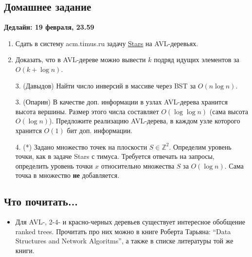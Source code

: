 \subsection{Домашнее задание}
\textbf{Дедлайн: 19 февраля, 23.59}

\begin{enumerate}

  \item Сдать в систему acm.timus.ru задачу
\href{http://acm.timus.ru/problem.aspx?space=1&num=1028}{Stars}
на AVL-деревьях.

  \item Доказать, что в AVL-дереве можно вывести $k$ подряд идущих элементов за
$O(k + \log n)$.

  \item[3.] (Давыдов) Найти число инверсий в массиве через BST за $O(n \log n)$.

  \item[3.] (Опарин) В качестве доп. информации в узлах AVL-дерева хранится
высота вершины. Размер этого числа составляет $O(\log \log n)$ (сама высота
$O(\log n)$). Предложите реализацию AVL-дерева, в каждом узле которого
хранится $O(1)$ бит доп. информации.

  \item[4.] (*) Задано множество точек на плоскости $S \in \mathbb{Z}^2$.
Определим уровень точки, как в задаче Stars с тимуса.  Требуется отвечать на
запросы, определить уровень точки $x$ относительно множества $S$ за $O(\log n)$.
Сама точка в множество \textbf{не} добавляется.

\end{enumerate}

\subsection{Что почитать...}

\begin{itemize}
  
  \item Для AVL-, 2-4- и красно-черных деревьев существует интересное обобщение
ranked trees. Прочитать про них можно в книге Роберта Тарьяна: ``Data Structures
and Network Algoritms'', а также в списке литературы той же книги.

\end{itemize}

\clearpage
